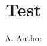 \documentclass[journal]{new-aiaa}
\title{Test}
\author{A. Author}
\begin{document}
\maketitle

\let\enquote\undefined

\end{document}

